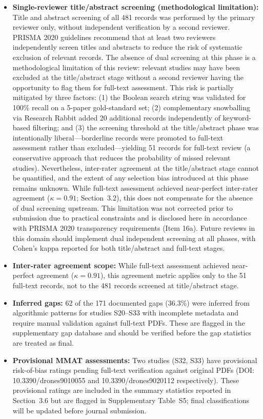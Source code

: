 \documentclass[review,3p,times]{elsarticle}
\begin{document}
\begin{itemize}
  \item \textbf{Single-reviewer title/abstract screening (methodological limitation):} Title and abstract screening of all 481 records was performed by the primary reviewer only, without independent verification by a second reviewer. PRISMA 2020 guidelines \cite{page2021} recommend that at least two reviewers independently screen titles and abstracts to reduce the risk of systematic exclusion of relevant records. The absence of dual screening at this phase is a methodological limitation of this review: relevant studies may have been excluded at the title/abstract stage without a second reviewer having the opportunity to flag them for full-text assessment. This risk is partially mitigated by three factors: (1) the Boolean search string was validated for 100\% recall on a 5-paper gold-standard set; (2) complementary snowballing via Research Rabbit added 20 additional records independently of keyword-based filtering; and (3) the screening threshold at the title/abstract phase was intentionally liberal---borderline records were promoted to full-text assessment rather than excluded---yielding 51 records for full-text review (a conservative approach that reduces the probability of missed relevant studies). Nevertheless, inter-rater agreement at the title/abstract stage cannot be quantified, and the extent of any selection bias introduced at this phase remains unknown. While full-text assessment achieved near-perfect inter-rater agreement ($\kappa=0.91$; Section~3.2), this does not compensate for the absence of dual screening upstream. This limitation was not corrected prior to submission due to practical constraints and is disclosed here in accordance with PRISMA 2020 transparency requirements (Item 16a). Future reviews in this domain should implement dual independent screening at all phases, with Cohen's kappa reported for both title/abstract and full-text stages.
  \item \textbf{Inter-rater agreement scope:} While full-text assessment achieved 
near-perfect agreement ($\kappa=0.91$), this agreement metric applies only to the 
51 full-text records, not to the 481 records screened at title/abstract stage.
  \item \textbf{Inferred gaps:} 62 of the 171 documented gaps (36.3\%) were inferred from algorithmic patterns for studies S20--S33 with incomplete metadata and require manual validation against full-text PDFs. These are flagged in the supplementary gap database and should be verified before the gap statistics are treated as final.
  \item \textbf{Provisional MMAT assessments:} Two studies (S32, S33) have provisional risk-of-bias ratings pending full-text verification against original PDFs (DOI: 10.3390/drones9010055 and 10.3390/drones9020112 respectively). These provisional ratings are included in the summary statistics reported in Section~3.6 but are flagged in Supplementary Table~S5; final classifications will be updated before journal submission.

\end{itemize}
\end{document}
